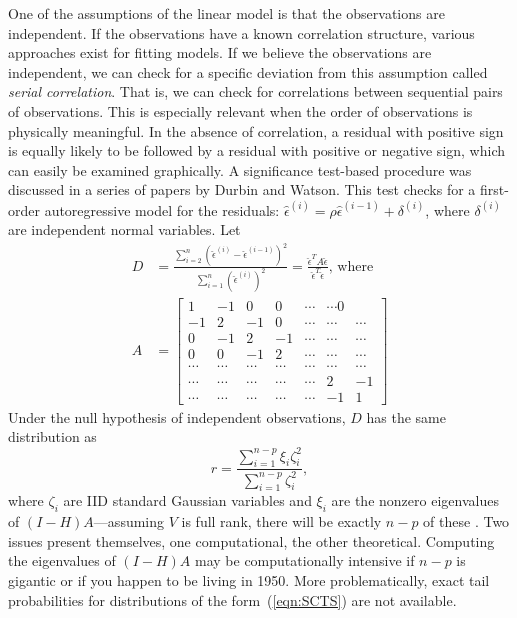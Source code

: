 \documentclass[12pt]{article}
\begin{document}
One of the assumptions of the linear model is that the observations are independent. If the observations have a known correlation structure, various approaches exist for fitting models. If we believe the observations are independent, we can check for a specific deviation from this assumption called \textit{serial correlation}. That is, we can check for correlations between sequential pairs of observations. This is especially relevant when the order of observations is physically meaningful. In the absence of correlation, a residual with positive sign is equally likely to be followed by a residual with positive or negative sign, which can easily be examined graphically. A significance test-based procedure was discussed in a series of papers by Durbin and Watson. This test checks for a first-order autoregressive model for the residuals: $\hat{\epsilon}^{(i)} = \rho \hat{\epsilon}^{(i-1)} + \delta^{(i)}$, where $\delta^{(i)}$ are independent normal variables. Let
\begin{align*}
   D &= \frac{\sum_{i=2}^n (\hat{\epsilon}^{(i)} - \hat{\epsilon}^{(i-1)})^2}{\sum_{i=1}^n (\hat{\epsilon}^{(i)})^2} = \frac{\hat{\epsilon}^T A \hat{\epsilon}}{\hat{\epsilon}^T \hat{\epsilon}} \textrm{, where} \\
   A &= \begin{bmatrix}
       1 & -1 & 0 & 0 & \cdots & \cdots 0 \\
       -1 & 2 & -1 & 0 & \cdots & \cdots & \cdots \\
       0 & -1 & 2 & -1 & \cdots & \cdots & \cdots  \\
       0 & 0 & -1 & 2 & \cdots & \cdots & \cdots \\
       \cdots & \cdots & \cdots & \cdots & \cdots & \cdots & \cdots \\
       \cdots & \cdots & \cdots & \cdots & \cdots & 2 & -1 \\
       \cdots & \cdots & \cdots & \cdots & \cdots & -1 & 1
   \end{bmatrix}
\end{align*}
Under the null hypothesis of independent observations, $D$ has the same distribution as
\begin{equation}\label{eqn:SCTS}
    r = \frac{\sum_{i=1}^{n-p} \xi_i \zeta_i^2}{\sum_{i=1}^{n-p} \zeta_i^2},
\end{equation}
where $\zeta_i$ are IID standard Gaussian variables and $\xi_i$ are the nonzero eigenvalues of $(I-H)A$---assuming $V$ is full rank, there will be exactly $n-p$ of these \cite[pg.~416]{DW:50}. Two issues present themselves, one computational, the other theoretical. Computing the eigenvalues of $(I-H)A$ may be computationally intensive if $n-p$ is gigantic or if you happen to be living in 1950. More problematically, exact tail probabilities for distributions of the form~(\ref{eqn:SCTS}) are not available.
\end{document}
